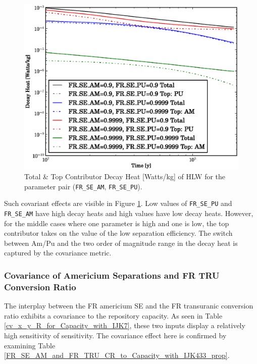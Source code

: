 \begin{figure}[htbp]
\begin{center}
\includegraphics[scale=0.70]{ct_sensitivity/figs/FR_SE_AM_and_FR_SE_PU_Decay_Heat.eps}
\caption{Total \& Top Contributor Decay Heat [Watts/kg] of HLW for the parameter pair (\texttt{FR\_SE\_AM}, \texttt{FR\_SE\_PU}).}
\label{am_pu_decay_heat}
\end{center}
\end{figure}

Such covariant effects are visible in Figure \ref{am_pu_decay_heat}.
Low values of \texttt{FR\_SE\_PU} and \texttt{FR\_SE\_AM} have high 
decay heats and high values have low decay heats.
However, for the middle cases where one parameter is high and one is 
low, the top contributor takes on the value of the low separation efficiency.
The switch between Am/Pu and the two order of magnitude range in the 
decay heat is captured by the covariance metric.


\subsubsection{Covariance of Americium Separations and FR TRU Conversion Ratio}
\label{cts_sec:am_se_fr_tru_cr}



The interplay between the FR americium SE and the FR transuranic conversion ratio exhibits a covariance
to the repository capacity.  As seen in Table \ref{cv_x_y_R_for_Capacity_with_IJK7}, 
these two inputs display a relatively high sensitivity of sensitivity.  
The covariance effect here is confirmed by examining 
Table \ref{FR_SE_AM_and_FR_TRU_CR_to_Capacity_with_IJK433_prop}.

